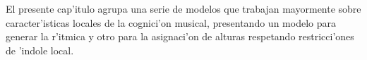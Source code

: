 El presente cap'itulo agrupa una serie de modelos que trabajan mayormente sobre caracter'isticas locales de la cognici'on musical, presentando un modelo 
para generar la r'itmica y otro para la asignaci'on de alturas respetando restricci'ones de 'indole local.
